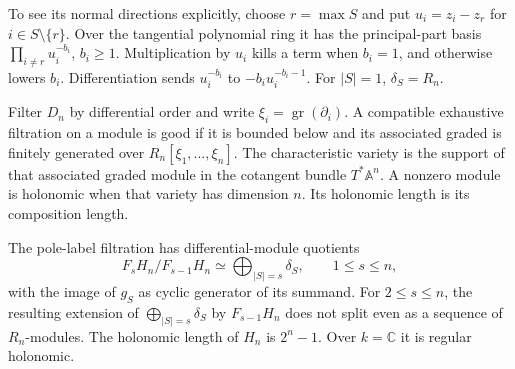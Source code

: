 To see its normal directions explicitly,
choose $r=\max S$ and put $u_i=z_i-z_r$ for $i\in S\setminus\{r\}$.
Over the tangential polynomial ring it has the principal-part
basis $\prod_{i\ne r}u_i^{-b_i}$, $b_i\geq1$.
Multiplication by $u_i$ kills a term when $b_i=1$, and otherwise
lowers $b_i$. Differentiation sends $u_i^{-b_i}$ to
$-b_i u_i^{-b_i-1}$. For $|S|=1$, $\delta_S=R_n$.

Filter $D_n$ by differential order and write
$\xi_i=\operatorname{gr}(\partial_i)$.
A compatible exhaustive filtration on a module is good if
it is bounded below and its associated graded is finitely
generated over $R_n[\xi_1,\ldots,\xi_n]$.
The characteristic variety is the support of that associated
graded module in the cotangent bundle $T^*\mathbb A^n$.
A nonzero module is holonomic when that variety has dimension
$n$. Its holonomic length is its composition length.

\begin{theorem}\label{cbc:hc:filtration}
The pole-label filtration has differential-module quotients
\begin{equation}\label{cbc:hc:graded}
 F_sH_n/F_{s-1}H_n\simeq\bigoplus_{|S|=s}\delta_S,
 \qquad 1\leq s\leq n,
\end{equation}
with the image of $g_S$ as cyclic generator of its summand.
For $2\leq s\leq n$, the resulting extension of
$\bigoplus_{|S|=s}\delta_S$ by $F_{s-1}H_n$ does not split
even as a sequence of $R_n$-modules. The holonomic length of
$H_n$ is $2^n-1$. Over $k=\mathbb C$ it is regular holonomic.
\end{theorem}

